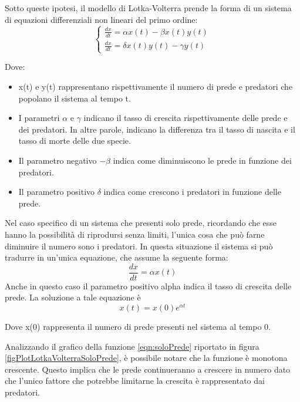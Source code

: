 \documentclass[11pt]{article}
\begin{document}
Sotto queste ipotesi, il modello di Lotka-Volterra prende la forma di un sistema di equazioni differenziali non lineari del primo ordine:
\[
\label{eqn:modelloGenerale}
\left\{
\begin{array}{cc}
\frac{dx}{dt}=\alpha x(t) - \beta x(t)y(t)\\
\frac{dx}{dt}=\delta x(t)y(t) - \gamma y(t)
\end{array}
\right.
\]

Dove: 
\begin{itemize}
    \item x(t) e y(t) rappresentano rispettivamente il numero di prede e predatori che popolano il sistema al tempo t.
    \item I parametri $\alpha$ e $\gamma$ indicano il tasso di crescita rispettivamente delle prede e dei predatori. In altre parole, indicano la differenza tra il tasso di nascita e il tasso di morte delle due specie.
    \item Il parametro negativo $-\beta$ indica come diminuiscono le prede in funzione dei predatori.
    \item Il parametro positivo $\delta$ indica come crescono i predatori in funzione delle prede. 
\end{itemize}

\noindent Nel caso specifico di un sistema che presenti solo prede, ricordando che esse hanno la possibilità di riprodursi senza limiti, l'unica cosa che può farne diminuire il numero sono i predatori.  
In questa situazione il sistema si può tradurre in un'unica equazione, che assume la seguente forma: 
\[
    \frac{dx}{dt} = \alpha x(t) 
\]
Anche in questo caso il parametro positivo alpha indica il tasso di crescita delle prede. 
La soluzione a tale equazione è 
\begin{equation}\label{eqn:soloPrede}
    x(t) = x(0)e^{\alpha t}
\end{equation}

\noindent Dove x(0) rappresenta il numero di prede presenti nel sistema al tempo 0.

\noindent Analizzando il grafico della funzione \eqref{eqn:soloPrede} riportato in figura \ref{figPlotLotkaVolterraSoloPrede}, è possibile notare che la funzione è monotona crescente. Questo implica che le prede continueranno a crescere in numero dato che l'unico fattore che potrebbe limitarne la crescita è rappresentato dai predatori. 
\end{document}
